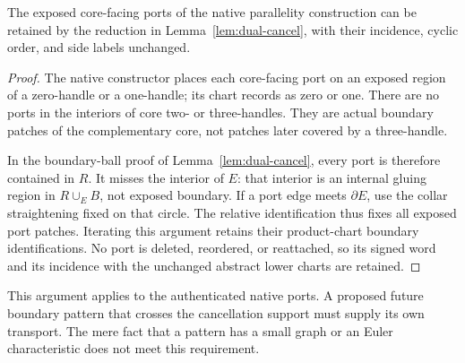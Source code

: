 \begin{lemma}\label{lem:ports}
The exposed core-facing ports of the native parallelity construction can be
retained by the reduction in Lemma~\ref{lem:dual-cancel}, with their incidence,
cyclic order, and side labels unchanged.
\end{lemma}
\begin{proof}
The native constructor places each core-facing port on an exposed region of
a zero-handle or a one-handle; its chart records  as
zero or one.  There are no ports in the interiors of core two- or
three-handles.  They are actual boundary patches of the complementary core,
not patches later covered by a three-handle.

In the boundary-ball proof of Lemma~\ref{lem:dual-cancel}, every port is
therefore contained in $R$.  It misses the interior of $E$: that interior
is an internal gluing region in $R\cup_E B$, not exposed boundary.
If a port edge meets $\partial E$, use the collar straightening fixed on
that circle.  The relative identification thus fixes all exposed port
patches.  Iterating this argument retains their product-chart boundary
identifications.  No port is deleted, reordered, or reattached, so its
signed word and its incidence with the unchanged abstract lower charts
are retained.
\end{proof}

This argument applies to the authenticated native ports.  A proposed future
boundary pattern that crosses the cancellation support must supply its own
transport.  The mere fact that a pattern has a small graph or an Euler
characteristic does not meet this requirement.

